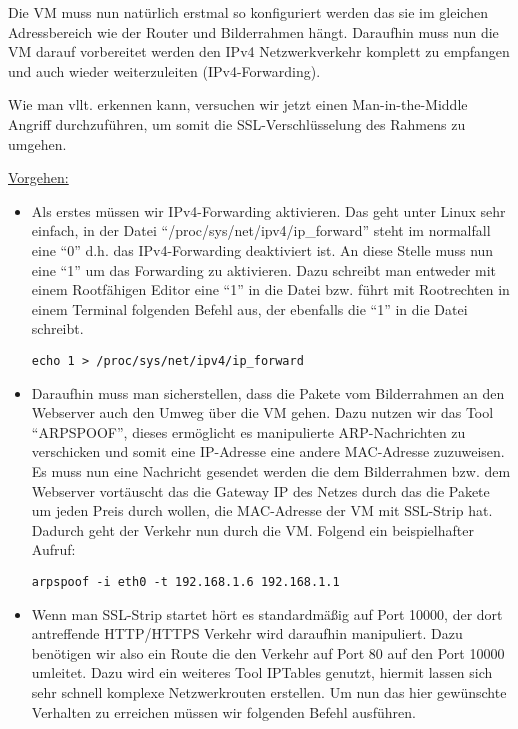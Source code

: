 \begin{flushleft}
    Die VM muss nun natürlich erstmal so konfiguriert werden das sie im gleichen Adressbereich wie der Router und Bilderrahmen hängt. Daraufhin muss nun die VM darauf vorbereitet werden den IPv4 Netzwerkverkehr komplett zu empfangen und auch wieder weiterzuleiten (IPv4-Forwarding).\par Wie man vllt. erkennen kann, versuchen wir jetzt einen Man-in-the-Middle Angriff durchzuführen, um somit die SSL-Verschlüsselung des Rahmens zu umgehen.\vspace{.3cm}
    
    \underline{Vorgehen:}\\
    \begin{itemize}
    \item Als erstes müssen wir IPv4-Forwarding aktivieren. Das geht unter Linux sehr einfach, in der Datei ``/proc/sys/net/ipv4/ip\_forward'' steht im normalfall eine ``0'' d.h. das IPv4-Forwarding deaktiviert ist. An diese Stelle muss nun eine ``1'' um das Forwarding zu aktivieren. Dazu schreibt man entweder mit einem Rootfähigen Editor eine ``1'' in die Datei bzw. führt mit Rootrechten in einem Terminal folgenden Befehl aus, der ebenfalls die ``1'' in die Datei schreibt.\\\vspace{.3cm}
    \begin{center}
      \verb+echo 1 > /proc/sys/net/ipv4/ip_forward+
    \end{center}    
    \item Daraufhin muss man sicherstellen, dass die Pakete vom Bilderrahmen an den Webserver auch den Umweg über die VM gehen. Dazu nutzen wir das Tool ``ARPSPOOF'', dieses ermöglicht es manipulierte ARP-Nachrichten zu verschicken und somit eine IP-Adresse eine andere MAC-Adresse zuzuweisen. Es muss nun eine Nachricht gesendet werden die dem Bilderrahmen bzw. dem Webserver vortäuscht das die Gateway IP des Netzes durch das die Pakete um jeden Preis durch wollen, die MAC-Adresse der VM mit SSL-Strip hat. Dadurch geht der Verkehr nun durch die VM. Folgend ein beispielhafter Aufruf:
    \begin{center}
      \verb+arpspoof -i eth0 -t 192.168.1.6 192.168.1.1+
    \end{center}
    \item Wenn man SSL-Strip startet hört es standardmäßig auf Port 10000, der dort antreffende HTTP/HTTPS Verkehr wird daraufhin manipuliert. Dazu benötigen wir also ein Route die den Verkehr auf Port 80 auf den Port 10000 umleitet. Dazu wird ein weiteres Tool IPTables genutzt, hiermit lassen sich sehr schnell komplexe Netzwerkrouten erstellen. Um nun das hier gewünschte Verhalten zu erreichen müssen wir folgenden Befehl ausführen.

\end{itemize}
\end{flushleft}
